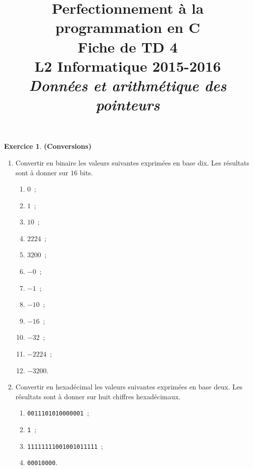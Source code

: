 \documentclass[12pt]{article}
\date{}
\title{{\bf Perfectionnement à la programmation en {\sf C}} \\
    Fiche de TD 4 \\
    {\small L2 Informatique 2015-2016} \\
    {\it \small Données et arithmétique des pointeurs}}
\theoremstyle{definition}
\newtheorem{Exercice}{Exercice}
\begin{document}
\maketitle

\begin{Exercice} {\bf (Conversions)}\smallskip

\begin{enumerate}
    \item Convertir en binaire les valeurs suivantes exprimées en base
    dix. Les résultats sont à donner sur $16$ bits.
    \begin{multicols}{4}
    \begin{enumerate}
        \item $0$~;
        \item $1$~;
        \item $10$~;
        \item $2224$~;
        \item $3200$~;
        \item $-0$~;
        \item $-1$~;
        \item $-10$~;
        \item $-16$~;
        \item $-32$~;
        \item $-2224$~;
        \item $-3200$.
    \end{enumerate}
    \end{multicols}
    \smallskip

    \item Convertir en hexadécimal les valeurs suivantes exprimées en
    base deux. Les résultats sont à donner sur huit chiffres hexadécimaux.
    \begin{multicols}{2}
    \begin{enumerate}
        \item {\tt 0011101010000001}~;
        \item {\tt 1}~;
        \item {\tt 11111111001001011111}~;
        \item {\tt 00010000}.
    \end{enumerate}
    \end{multicols}
    \smallskip


\end{enumerate}
\end{Exercice}
\end{document}
